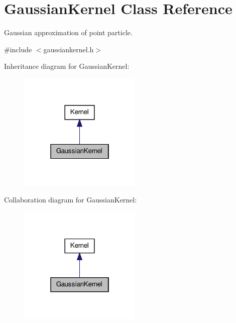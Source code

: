 \hypertarget{classGaussianKernel}{\section{\-Gaussian\-Kernel \-Class \-Reference}
\label{classGaussianKernel}
}


\-Gaussian approximation of point particle.  




{\ttfamily \#include $<$gaussiankernel.\-h$>$}



\-Inheritance diagram for \-Gaussian\-Kernel\-:
\nopagebreak
\begin{figure}[H]
\begin{center}
\leavevmode
\includegraphics[width=166pt]{classGaussianKernel__inherit__graph}
\end{center}
\end{figure}


\-Collaboration diagram for \-Gaussian\-Kernel\-:
\nopagebreak
\begin{figure}[H]
\begin{center}
\leavevmode
\includegraphics[width=166pt]{classGaussianKernel__coll__graph}
\end{center}
\end{figure}
